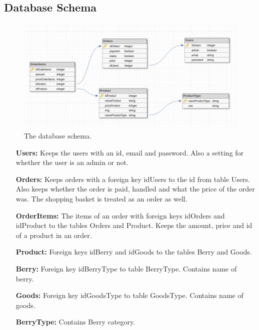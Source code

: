 \newpage

\subsection{Database Schema}

\begin{figure}[H]
  \centering
  \includegraphics[width=\textwidth]{second_sprint/db_schema.png}
  \caption{\label{fig:schema} The database schema.}
\end{figure}

\begin{itemize}
  \item[\textbf{Users:}] Keeps the users with an id, email and password. Also a
    setting for whether the user is an admin or not.
  \item[\textbf{Orders:}] Keeps orders with a foreign key idUsers to the
    id from table Users. Also keeps whether the order is paid, handled and
    what the price of the order was. The shopping basket is treated as an
    order as well.
  \item[\textbf{OrderItems:}] The items of an order with foreign keys
    idOrders and idProduct to the tables Orders and Product.  Keeps the
    amount, price and id of a product in an order.
  \item[\textbf{Product:}] Foreign keys idBerry and idGoods to the tables
    Berry and Goods.
  \item[\textbf{Berry:}] Foreign key idBerryType to table BerryType. Contains
    name of berry.
  \item[\textbf{Goods:}] Foreign key idGoodsType to table GoodsType. Contains
    name of goods.
  \item[\textbf{BerryType:}] Contains Berry category.
\end{itemize}
